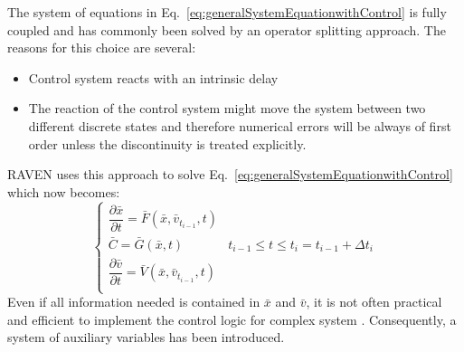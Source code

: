 \documentclass{mc2013}
\begin{document}
The system of equations in Eq.~\ref{eq:generalSystemEquationwithControl} is fully coupled and has commonly been solved by an operator splitting approach. The reasons for this choice are several:
\begin{itemize}
\item Control system reacts with an intrinsic delay
\item The reaction of the control system might move the system between two different discrete states and
therefore numerical errors will be always of first order unless the discontinuity is treated explicitly.
\end{itemize}
RAVEN uses this approach to solve Eq.~\ref{eq:generalSystemEquationwithControl} which now becomes:
\begin{equation}
\begin{cases} 
\dfrac{\partial \bar{x}}{\partial t} = \bar{F}(\bar{x},\bar{v}_{t_{i-1}},t) \\
\bar{C} = \bar{G}(\bar{x},t) & t_{i-1}\leq t\leq t_{i} = t_{i-1} + \Delta t_{i}\\ 
\dfrac{\partial \bar{v}}{\partial t} = \bar{V}(\bar{x},\bar{v}_{t_{i-1}},t) \\
\end{cases}
\label{eq:generalSystemEquationwithControlSplitting}
\end{equation}
Even if all information needed is contained in $\bar{x}$ and $\bar{v}$, it is not often practical and efficient to implement the control logic for complex system . Consequently, a system of auxiliary variables has been introduced.
\end{document}
